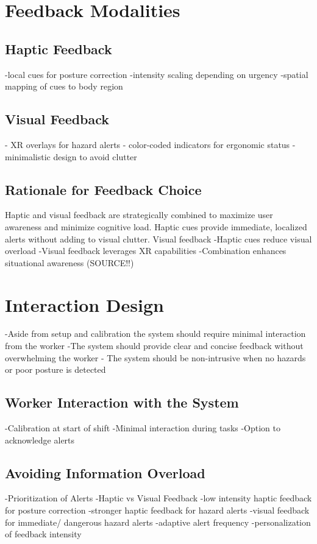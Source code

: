 \section{Feedback Modalities}
\subsection{Haptic Feedback}
-local cues for posture correction
-intensity scaling depending on urgency
-spatial mapping of cues to body region
\subsection{Visual Feedback}
- XR overlays for hazard alerts
- color-coded indicators for ergonomic status
- minimalistic design to avoid clutter

\subsection{Rationale for Feedback Choice}
Haptic and visual feedback are strategically combined to maximize user awareness and minimize cognitive load. Haptic cues provide immediate, localized alerts without adding to visual clutter. Visual feedback 
-Haptic cues reduce visual overload
-Visual feedback leverages XR capabilities
-Combination enhances situational awareness (SOURCE!!)

\section{Interaction Design}
-Aside from setup and calibration the system should require minimal interaction from the worker
-The system should provide clear and concise feedback without overwhelming the worker
- The system should be non-intrusive when no hazards or poor posture is detected
\subsection{Worker Interaction with the System}
-Calibration at start of shift
-Minimal interaction during tasks
-Option to acknowledge alerts

\subsection{Avoiding Information Overload}
-Prioritization of Alerts
-Haptic vs Visual Feedback
-low intensity haptic feedback for posture correction
-stronger haptic feedback for hazard alerts
-visual feedback for immediate/ dangerous hazard alerts
-adaptive alert frequency 
-personalization of feedback intensity

